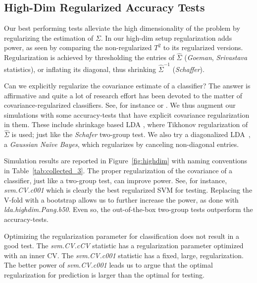 \documentclass[oupdraft]{bio}
\begin{document}
\subsection{High-Dim Regularized Accuracy Tests}
\label{sec:highdim}

Our best performing tests alleviate the high dimensionality of the problem by regularizing the estimation of $\Sigma$. 
In our high-dim setup regularization adds power, as seen by comparing the non-regularized $T^2$ to its regularized versions.
Regularization is achieved by thresholding the entries of $\hat{\Sigma}$ (\emph{Goeman}, \emph{Srivastava} statistics), or inflating its diagonal, thus shrinking $\hat \Sigma^{-1}$ (\emph{Schaffer}). 

Can we explicitly regularize the covariance estimate of a classifier?
The answer is affirmative and quite a lot of research effort has been devoted to the matter of covariance-regularized classifiers. 
See, for instance \cite{bickel2004some} or \cite{dobriban2018high}.
We thus augment our simulations with some accuracy-tests that have explicit covariance regularization in them. 
These include shrinkage based LDA \citep{pang_shrinkage-based_2009,ramey_high-dimensional_2016}, where Tikhonov regularization of $\hat \Sigma$ is used; just like the \emph{Schafer} two-group test.
We also try a diagonalized LDA~\citep{dudoit_comparison_2002}, a \emph{Gaussian Na\"ive Bayes}, which regularizes by canceling non-diagonal entries. 

Simulation results are reported in Figure~\ref{fig:highdim} with naming conventions in Table~\ref{tab:collected_3}.
The proper regularization of the covariance of a classifier, just like a two-group test, can improve power. 
See, for instance, \emph{svm.CV.c001} which is clearly the best regularized SVM for testing. 
Replacing the V-fold  with a bootstrap allows us to further increase the power, as done with \emph{lda.highdim.Pang.b50}.
Even so, the out-of-the-box two-group tests outperform the accuracy-tests.

Optimizing the regularization parameter for classification does not result in a good test.
The \emph{svm.CV.cCV} statistic has a regularization parameter optimized with an inner CV. 
The \emph{svm.CV.c001} statistic has a fixed, large, regularization.
The better power of \emph{svm.CV.c001} leads us to argue that the optimal regularization for prediction is larger than the optimal for testing.

\bigskip
\end{document}
